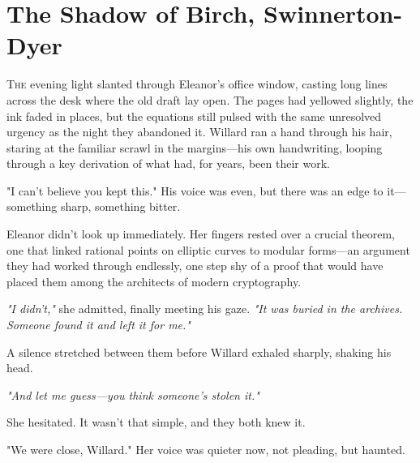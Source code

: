 \chapter{The Shadow of Birch, Swinnerton-Dyer}

\lettrine{T}{he} evening light slanted through Eleanor’s office window, casting long lines across the desk where the old draft lay open. The pages had yellowed slightly, the ink faded in places, but the equations still pulsed with the same unresolved urgency as the night they abandoned it. Willard ran a hand through his hair, staring at the familiar scrawl in the margins—his own handwriting, looping through a key derivation of what had, for years, been their work.

\smallskip

"I can’t believe you kept this." His voice was even, but there was an edge to it—something sharp, something bitter.

\smallskip

Eleanor didn’t look up immediately. Her fingers rested over a crucial theorem, one that linked rational points on elliptic curves to modular forms—an argument they had worked through endlessly, one step shy of a proof that would have placed them among the architects of modern cryptography.

\smallskip

\textit{"I didn’t,"} she admitted, finally meeting his gaze. \textit{"It was buried in the archives. Someone found it and left it for me."}

\smallskip

A silence stretched between them before Willard exhaled sharply, shaking his head.

\smallskip

\textit{"And let me guess—you think someone’s stolen it."}

\smallskip

She hesitated. It wasn’t that simple, and they both knew it.

\smallskip

"We were close, Willard." Her voice was quieter now, not pleading, but haunted.

\smallskip

